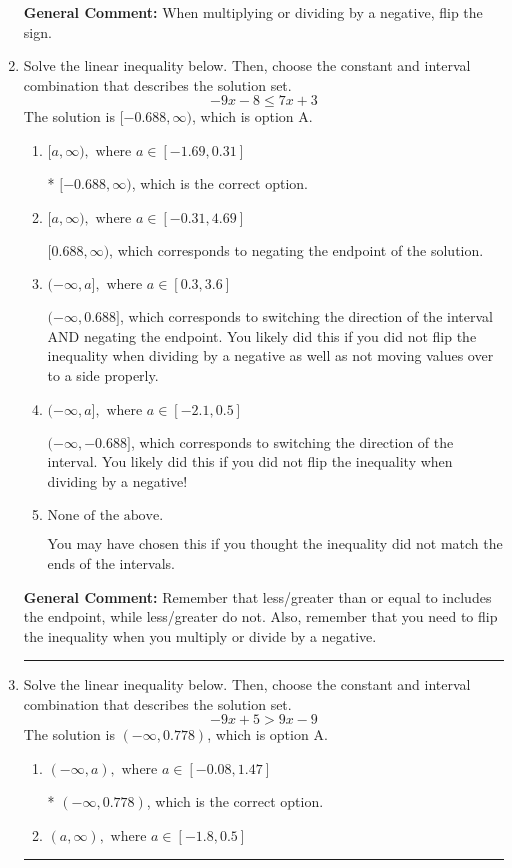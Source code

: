 \documentclass{extbook}[14pt]
\newcommand{\litem}[1]{\item #1

\rule{\textwidth}{0.4pt}}
\begin{document}
\begin{enumerate}
{\textbf{General Comment:} When multiplying or dividing by a negative, flip the sign.
}
\litem{
Solve the linear inequality below. Then, choose the constant and interval combination that describes the solution set.
\[ -9x -8 \leq 7x + 3 \]The solution is \( [-0.688, \infty) \), which is option A.\begin{enumerate}[label=\Alph*.]
\item \( [a, \infty), \text{ where } a \in [-1.69, 0.31] \)

* $[-0.688, \infty)$, which is the correct option.
\item \( [a, \infty), \text{ where } a \in [-0.31, 4.69] \)

 $[0.688, \infty)$, which corresponds to negating the endpoint of the solution.
\item \( (-\infty, a], \text{ where } a \in [0.3, 3.6] \)

 $(-\infty, 0.688]$, which corresponds to switching the direction of the interval AND negating the endpoint. You likely did this if you did not flip the inequality when dividing by a negative as well as not moving values over to a side properly.
\item \( (-\infty, a], \text{ where } a \in [-2.1, 0.5] \)

 $(-\infty, -0.688]$, which corresponds to switching the direction of the interval. You likely did this if you did not flip the inequality when dividing by a negative!
\item \( \text{None of the above}. \)

You may have chosen this if you thought the inequality did not match the ends of the intervals.
\end{enumerate}

\textbf{General Comment:} Remember that less/greater than or equal to includes the endpoint, while less/greater do not. Also, remember that you need to flip the inequality when you multiply or divide by a negative.
}
\litem{
Solve the linear inequality below. Then, choose the constant and interval combination that describes the solution set.
\[ -9x + 5 > 9x -9 \]The solution is \( (-\infty, 0.778) \), which is option A.\begin{enumerate}[label=\Alph*.]
\item \( (-\infty, a), \text{ where } a \in [-0.08, 1.47] \)

* $(-\infty, 0.778)$, which is the correct option.
\item \( (a, \infty), \text{ where } a \in [-1.8, 0.5] \)


\end{enumerate}}
\end{enumerate}
\end{document}

